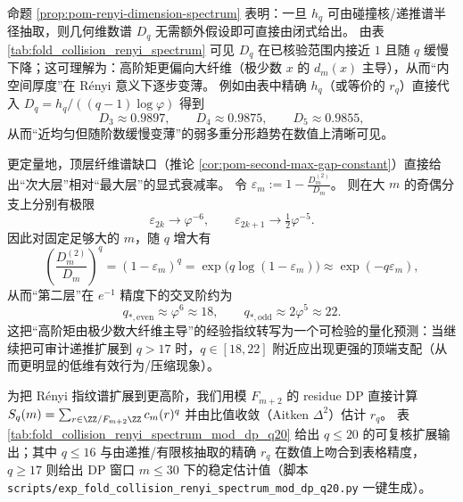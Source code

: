 \begin{remark}\label{rem:pom-renyi-dimension-values}
命题 \ref{prop:pom-renyi-dimension-spectrum} 表明：一旦 \(h_q\) 可由碰撞核/递推谱半径抽取，则几何维数谱 \(D_q\) 无需额外假设即可直接由闭式给出。
由表 \ref{tab:fold_collision_renyi_spectrum} 可见 \(D_q\) 在已核验范围内接近 \(1\) 且随 \(q\) 缓慢下降；这可理解为：高阶矩更偏向大纤维（极少数 \(x\) 的 \(d_m(x)\) 主导），从而“内空间厚度”在 Rényi 意义下逐步变薄。
例如由表中精确 \(h_q\)（或等价的 \(r_q\)）直接代入
\(
D_q=h_q/((q-1)\log\varphi)
\)
得到
\[
D_3\approx 0.9897,\qquad D_4\approx 0.9875,\qquad D_5\approx 0.9855,
\]
从而“近均匀但随阶数缓慢变薄”的弱多重分形趋势在数值上清晰可见。
\par
更定量地，顶层纤维谱缺口（推论 \ref{cor:pom-second-max-gap-constant}）直接给出“次大层”相对“最大层”的显式衰减率。
令
\(
\varepsilon_m:=1-\frac{D_m^{(2)}}{D_m}
\)。
则在大 \(m\) 的奇偶分支上分别有极限
\[
\varepsilon_{2k}\to \varphi^{-6},
\qquad
\varepsilon_{2k+1}\to \tfrac12\varphi^{-5}.
\]
因此对固定足够大的 \(m\)，随 \(q\) 增大有
\[
\left(\frac{D_m^{(2)}}{D_m}\right)^q
=(1-\varepsilon_m)^q
=\exp\!\bigl(q\log(1-\varepsilon_m)\bigr)
\approx \exp(-q\varepsilon_m),
\]
从而“第二层”在 \(e^{-1}\) 精度下的交叉阶约为
\[
q_{\ast,\mathrm{even}}\approx \varphi^{6}\approx 18,
\qquad
q_{\ast,\mathrm{odd}}\approx 2\varphi^{5}\approx 22.
\]
这把“高阶矩由极少数大纤维主导”的经验指纹转写为一个可检验的量化预测：当继续把可审计递推扩展到 \(q>17\) 时，\(q\in[18,22]\) 附近应出现更强的顶端支配（从而更明显的低维有效行为/压缩现象）。
\end{remark}



\begin{remark}[扩展指纹（可复核）：\texorpdfstring{$q\le 20$}{q<=20} 的 \texorpdfstring{$r_q$}{rq} 与 \texorpdfstring{$h_q$}{hq}]\label{rem:pom-renyi-spectrum-q20}
为把 Rényi 指纹谱扩展到更高阶，我们用模 \(F_{m+2}\) 的 residue DP 直接计算
\(
S_q(m)=\sum_{r\in\ZZ/F_{m+2}\ZZ}c_m(r)^q
\)
并由比值收敛（Aitken \(\Delta^2\)）估计 \(r_q\)。
表 \ref{tab:fold_collision_renyi_spectrum_mod_dp_q20} 给出 \(q\le 20\) 的可复核扩展输出；其中 \(q\le 16\) 与由递推/有限核抽取的精确 \(r_q\) 在数值上吻合到表格精度，\(q\ge 17\) 则给出 DP 窗口 \(m\le 30\) 下的稳定估计值（脚本 \texttt{scripts/exp\_fold\_collision\_renyi\_spectrum\_mod\_dp\_q20.py} 一键生成）。
\end{remark}

